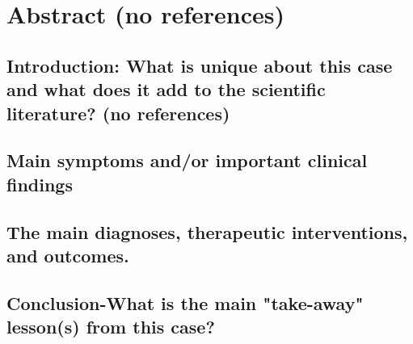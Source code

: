 \section*{ Abstract (no references)}

\subsection*{Introduction: What is unique about this case and what does it add to the scientific literature? (no references)}
\subsection*{Main symptoms and/or important clinical findings}
\subsection*{The main diagnoses, therapeutic interventions, and outcomes.}
\subsection*{Conclusion-What is the main "take-away" lesson(s) from this case?}

